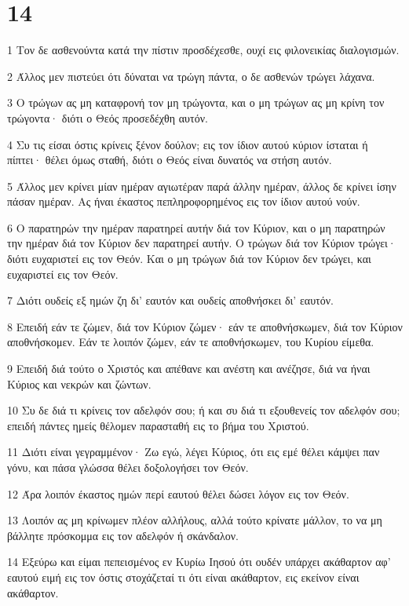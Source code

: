 \chapter{14}

\par 1 Τον δε ασθενούντα κατά την πίστιν προσδέχεσθε, ουχί εις φιλονεικίας διαλογισμών.
\par 2 Άλλος μεν πιστεύει ότι δύναται να τρώγη πάντα, ο δε ασθενών τρώγει λάχανα.
\par 3 Ο τρώγων ας μη καταφρονή τον μη τρώγοντα, και ο μη τρώγων ας μη κρίνη τον τρώγοντα· διότι ο Θεός προσεδέχθη αυτόν.
\par 4 Συ τις είσαι όστις κρίνεις ξένον δούλον; εις τον ίδιον αυτού κύριον ίσταται ή πίπτει· θέλει όμως σταθή, διότι ο Θεός είναι δυνατός να στήση αυτόν.
\par 5 Άλλος μεν κρίνει μίαν ημέραν αγιωτέραν παρά άλλην ημέραν, άλλος δε κρίνει ίσην πάσαν ημέραν. Ας ήναι έκαστος πεπληροφορημένος εις τον ίδιον αυτού νούν.
\par 6 Ο παρατηρών την ημέραν παρατηρεί αυτήν διά τον Κύριον, και ο μη παρατηρών την ημέραν διά τον Κύριον δεν παρατηρεί αυτήν. Ο τρώγων διά τον Κύριον τρώγει· διότι ευχαριστεί εις τον Θεόν. Και ο μη τρώγων διά τον Κύριον δεν τρώγει, και ευχαριστεί εις τον Θεόν.
\par 7 Διότι ουδείς εξ ημών ζη δι' εαυτόν και ουδείς αποθνήσκει δι' εαυτόν.
\par 8 Επειδή εάν τε ζώμεν, διά τον Κύριον ζώμεν· εάν τε αποθνήσκωμεν, διά τον Κύριον αποθνήσκομεν. Εάν τε λοιπόν ζώμεν, εάν τε αποθνήσκωμεν, του Κυρίου είμεθα.
\par 9 Επειδή διά τούτο ο Χριστός και απέθανε και ανέστη και ανέζησε, διά να ήναι Κύριος και νεκρών και ζώντων.
\par 10 Συ δε διά τι κρίνεις τον αδελφόν σου; ή και συ διά τι εξουθενείς τον αδελφόν σου; επειδή πάντες ημείς θέλομεν παρασταθή εις το βήμα του Χριστού.
\par 11 Διότι είναι γεγραμμένον· Ζω εγώ, λέγει Κύριος, ότι εις εμέ θέλει κάμψει παν γόνυ, και πάσα γλώσσα θέλει δοξολογήσει τον Θεόν.
\par 12 Άρα λοιπόν έκαστος ημών περί εαυτού θέλει δώσει λόγον εις τον Θεόν.
\par 13 Λοιπόν ας μη κρίνωμεν πλέον αλλήλους, αλλά τούτο κρίνατε μάλλον, το να μη βάλλητε πρόσκομμα εις τον αδελφόν ή σκάνδαλον.
\par 14 Εξεύρω και είμαι πεπεισμένος εν Κυρίω Ιησού ότι ουδέν υπάρχει ακάθαρτον αφ' εαυτού ειμή εις τον όστις στοχάζεταί τι ότι είναι ακάθαρτον, εις εκείνον είναι ακάθαρτον.
